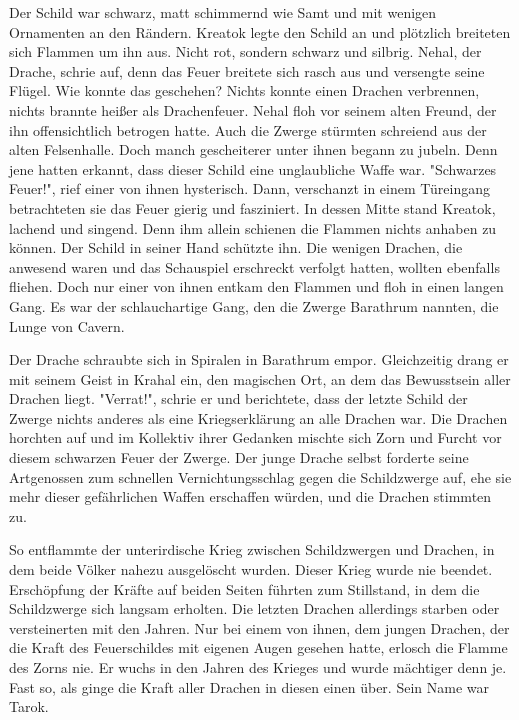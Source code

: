 \documentclass[10pt, a4paper, oneside]{book}
\begin{document}
\begin{multicols}{2}
Der Schild war schwarz, matt schimmernd wie Samt und mit wenigen Ornamenten an den Rändern. Kreatok legte den Schild an und plötzlich breiteten sich Flammen um ihn aus. Nicht rot, sondern schwarz und silbrig. Nehal, der Drache, schrie auf, denn das Feuer breitete sich rasch aus und versengte seine Flügel. Wie konnte das geschehen? Nichts konnte einen Drachen verbrennen, nichts brannte heißer als Drachenfeuer. Nehal floh vor seinem alten Freund, der ihn offensichtlich betrogen hatte. Auch die Zwerge stürmten schreiend aus der alten Felsenhalle. Doch manch gescheiterer unter ihnen begann zu jubeln. Denn jene hatten erkannt, dass dieser Schild eine unglaubliche Waffe war. "Schwarzes Feuer!", rief einer von ihnen hysterisch. Dann, verschanzt in einem Türeingang betrachteten sie das Feuer gierig und fasziniert. In dessen Mitte stand Kreatok, lachend und singend. Denn ihm allein schienen die Flammen nichts anhaben zu können. Der Schild in seiner Hand schützte ihn. Die wenigen Drachen, die anwesend waren und das Schauspiel erschreckt verfolgt hatten, wollten ebenfalls fliehen. Doch nur einer von ihnen entkam den Flammen und floh in einen langen Gang. Es war der schlauchartige Gang, den die Zwerge Barathrum nannten, die Lunge von Cavern. 

Der Drache schraubte sich in Spiralen in Barathrum empor. Gleichzeitig drang er mit seinem Geist in Krahal ein, den magischen Ort, an dem das Bewusstsein aller Drachen liegt. "Verrat!", schrie er und berichtete, dass der letzte Schild der Zwerge nichts anderes als eine Kriegserklärung an alle Drachen war. Die Drachen horchten auf und im Kollektiv ihrer Gedanken mischte sich Zorn und Furcht vor diesem schwarzen Feuer der Zwerge. Der junge Drache selbst forderte seine Artgenossen zum schnellen Vernichtungsschlag gegen die Schildzwerge auf, ehe sie mehr dieser gefährlichen Waffen erschaffen würden, und die Drachen stimmten zu.

So entflammte der unterirdische Krieg zwischen Schildzwergen und Drachen, in dem beide Völker nahezu ausgelöscht wurden. Dieser Krieg wurde nie beendet. Erschöpfung der Kräfte auf beiden Seiten führten zum Stillstand, in dem die Schildzwerge sich langsam erholten. Die letzten Drachen allerdings starben oder versteinerten mit den Jahren. Nur bei einem von ihnen, dem jungen Drachen, der die Kraft des Feuerschildes mit eigenen Augen gesehen hatte, erlosch die Flamme des Zorns nie. Er wuchs in den Jahren des Krieges und wurde mächtiger denn je. Fast so, als ginge die Kraft aller Drachen in diesen einen über. Sein Name war Tarok.




\end{multicols}
\end{document}
